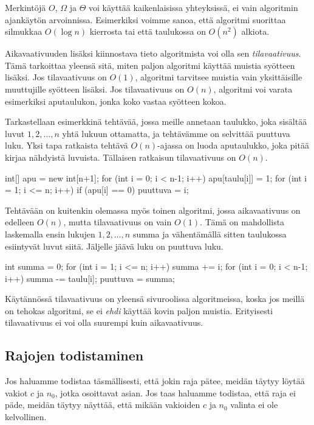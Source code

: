 Merkintöjä $O$, $\Omega$ ja $\Theta$ voi käyttää
kaikenlaisissa yhteyksissä, ei vain algoritmin ajankäytön arvoinnissa.
Esimerkiksi voimme sanoa, että algoritmi suorittaa silmukkaa $O(\log n)$ kierrosta
tai että taulukossa on $O(n^2)$ alkiota.

Aikavaativuuden lisäksi kiinnostava tieto algoritmista voi olla sen
\emph{tilavaativuus}. Tämä tarkoittaa yleensä sitä, miten paljon algoritmi
käyttää muistia syötteen lisäksi.
Jos tilavaativuus on $O(1)$, algoritmi tarvitsee muistia
vain yksittäisille muuttujille syötteen lisäksi.
Jos tilavaativuus on $O(n)$, algoritmi voi varata esimerkiksi aputaulukon,
jonka koko vastaa syötteen kokoa.

Tarkastellaan esimerkkinä tehtävää, jossa meille annetaan taulukko,
joka sisältää luvut $1,2,\dots,n$ yhtä lukuun ottamatta,
ja tehtävämme on selvittää puuttuva luku.
Yksi tapa ratkaista tehtävä $O(n)$-ajassa on luoda aputaulukko,
joka pitää kirjaa nähdyistä luvuista.
Tällaisen ratkaisun tilavaativuus on $O(n)$.

\begin{code}
int[] apu = new int[n+1];
for (int i = 0; i < n-1; i++) {
    apu[taulu[i]] = 1;
}
for (int i = 1; i <= n; i++) {
    if (apu[i] == 0) puuttuva = i;
}
\end{code}

Tehtävään on kuitenkin olemassa myös toinen algoritmi,
jossa aikavaativuus on edelleen $O(n)$, mutta tilavaativuus on vain $O(1)$.
Tämä on mahdollista laskemalla ensin lukujen $1,2,\dots,n$ summa
ja vähentämällä sitten taulukossa esiintyvät luvut siitä.
Jäljelle jäävä luku on puuttuva luku.

\begin{code}
int summa = 0;
for (int i = 1; i <= n; i++) {
    summa += i;
}
for (int i = 0; i < n-1; i++) {
    summa -= taulu[i];
}
puuttuva = summa;
\end{code}

Käytännössä tilavaativuus on yleensä sivuroolissa algoritmeissa,
koska jos meillä on tehokas algoritmi, se ei \emph{ehdi} käyttää kovin paljon muistia.
Erityisesti tilavaativuus ei voi olla suurempi kuin aikavaativuus.

\subsection{Rajojen todistaminen}

Jos haluamme todistaa täsmällisesti, että jokin raja pätee,
meidän täytyy löytää vakiot $c$ ja $n_0$, jotka osoittavat asian.
Jos taas haluamme todistaa, että raja ei päde,
meidän täytyy näyttää, että mikään vakioiden $c$ ja $n_0$ valinta ei ole kelvollinen.

